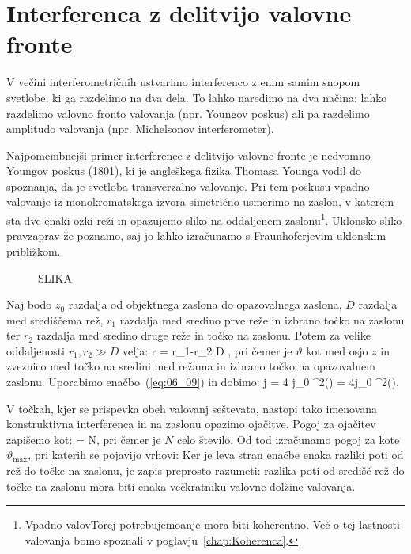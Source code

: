 \section{Interferenca z delitvijo valovne fronte}
V večini interferometričnih ustvarimo interferenco z enim samim snopom svetlobe, 
ki ga razdelimo na dva dela. To lahko naredimo na dva načina: lahko razdelimo
valovno fronto valovanja (npr. Youngov poskus) ali pa razdelimo amplitudo
valovanja (npr. Michelsonov interferometer). 

Najpomembnejši primer interference z delitvijo valovne fronte je nedvomno
Youngov poskus (1801), ki je angleškega fizika Thomasa Younga vodil do spoznanja,
da je svetloba transverzalno valovanje. Pri tem poskusu vpadno valovanje iz 
monokromatskega izvora simetrično usmerimo na zaslon, v katerem sta dve enaki ozki
reži in opazujemo sliko na oddaljenem zaslonu\footnote{Vpadno valovTorej potrebujemoanje mora biti 
koherentno. Več o tej lastnosti valovanja 
bomo spoznali v poglavju~\ref{chap:Koherenca}.}. Uklonsko sliko 
pravzaprav že poznamo, saj jo lahko izračunamo s Fraunhoferjevim 
uklonskim približkom.
\begin{figure}[ht]
\centering
\def\svgwidth{120truemm} 
%
\caption{SLIKA}
\label{fig:06_Young}
\end{figure}

Naj bodo $z_0$ razdalja od objektnega zaslona do opazovalnega zaslona, $D$ razdalja 
med središčema rež, $r_1$ razdalja med sredino prve reže in izbrano točko na zaslonu
ter $r_2$ razdalja med sredino druge reže in točko na zaslonu. Potem za velike 
oddaljenosti $r_1, r_2 \gg D$ velja:
\beq
\Delta r = r_1-r_2 \approx D \sin\vartheta,
\label{eq:06_16}
\eeq
pri čemer je $\vartheta$ kot med osjo $z$ in zveznico med točko na sredini med režama in
izbrano točko na opazovalnem zaslonu. Uporabimo enačbo~(\ref{eq:06_09}) in dobimo:
\beq
j = 4 j_0 \cos^2\left(\right) = 4j_0 \cos^2\left(\right).
\label{eq:06_17}
\eeq

V točkah, kjer se prispevka obeh valovanj seštevata, nastopi tako imenovana
konstruktivna interferenca in na zaslonu opazimo ojačitve. Pogoj za ojačitev zapišemo kot:
\beq
{} = N\pi,
\label{eq:06_18}
\eeq
pri čemer je $N$ celo število. Od tod izračunamo pogoj za kote $\vartheta_\mathrm{max}$, pri katerih
se pojavijo vrhovi:
Ker je leva stran enačbe enaka razliki poti od rež do točke na zaslonu, je zapis preprosto razumeti:
razlika poti od središč rež do točke na zaslonu mora biti enaka večkratniku valovne dolžine valovanja.

